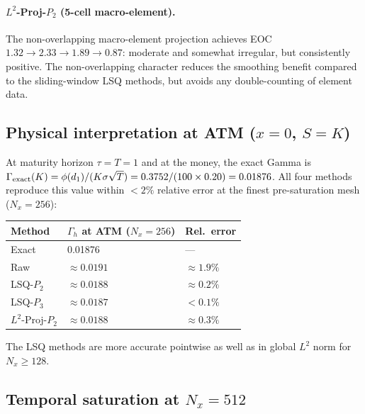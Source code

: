 \documentclass[11pt,a4paper]{article}
\newcommand{\Nx}{N_x}
\begin{document}
\paragraph{$L^2$-Proj-$P_2$ (5-cell macro-element).}
The non-overlapping macro-element projection achieves EOC
$1.32 \to 2.33 \to 1.89 \to 0.87$: moderate and somewhat irregular,
but consistently positive.  The non-overlapping character reduces the
smoothing benefit compared to the sliding-window LSQ methods, but
avoids any double-counting of element data.

\subsection{Physical interpretation at ATM ($x = 0$, $S = K$)}
\label{sec:atm}

At maturity horizon $\tau = T = 1$ and at the money, the exact Gamma is
$\Gamma_{\rm exact}(K) = \phi(d_1)/(K\sigma\sqrt{T})
= 0.3752/(100 \times 0.20) = 0.01876$.
All four methods reproduce this value within $<\!2\%$ relative error
at the finest pre-saturation mesh ($\Nx = 256$):
\begin{center}
\begin{tabular}{lll}
\toprule
Method & $\Gamma_h$ at ATM ($\Nx=256$) & Rel.\ error \\
\midrule
Exact & 0.01876 & --- \\
Raw              & $\approx 0.0191$ & $\approx 1.9\%$ \\
LSQ-$P_2$        & $\approx 0.0188$ & $\approx 0.2\%$ \\
LSQ-$P_3$        & $\approx 0.0187$ & $< 0.1\%$ \\
$L^2$-Proj-$P_2$ & $\approx 0.0188$ & $\approx 0.3\%$ \\
\bottomrule
\end{tabular}
\end{center}
The LSQ methods are more accurate pointwise as well as in global $L^2$ norm
for $\Nx \ge 128$.

\subsection{Temporal saturation at $\Nx = 512$}
\label{sec:temporal-saturation}
\end{document}
